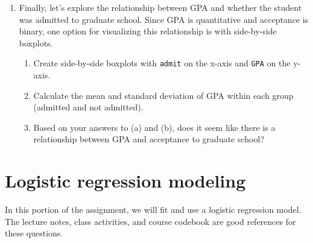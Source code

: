 \documentclass[11pt]{article}
\begin{document}
\begin{enumerate}
\begin{enumerate}
\item Using your summary statistics from (b) and your histogram from (a), write 1--2 sentences summarizing the distribution of GPA. You should discuss the shape (skewness and modality), center, spread, and whether there are any potential outliers.
\end{enumerate}

\item Finally, let's explore the relationship between GPA and whether the student was admitted to graduate school. Since GPA is quantitative and acceptance is binary, one option for visualizing this relationship is with side-by-side boxplots.

\begin{enumerate}
\item Create side-by-side boxplots with \verb;admit; on the x-axis and \verb;GPA; on the y-axis. 

\item Calculate the mean and standard deviation of GPA within each group (admitted and not admitted).

\item Based on your answers to (a) and (b), does it seem like there is a relationship between GPA and acceptance to graduate school?
\end{enumerate}

\end{enumerate}

\bigskip

\section{Logistic regression modeling}

In this portion of the assignment, we will fit and use a logistic regression model. The lecture notes, class activities, and course codebook are good references for these questions.
\end{document}
